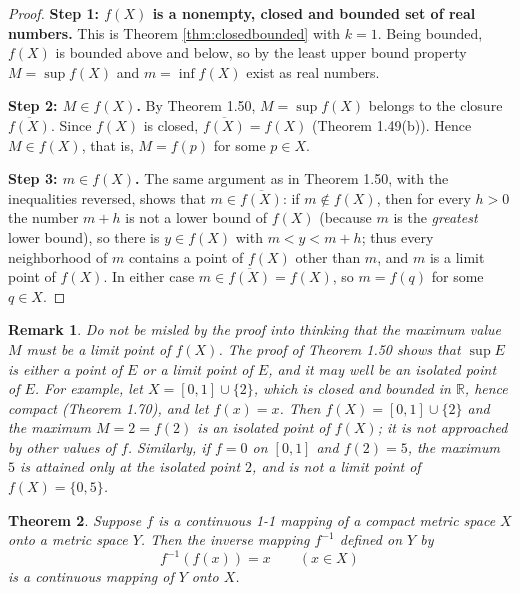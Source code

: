 \documentclass{article}
\theoremstyle{mythm}
\newtheorem{theorem}{Theorem}[section]
\newtheorem{remark}[theorem]{Remark}
\begin{document}
\begin{proof}
\textbf{Step 1: $f(X)$ is a nonempty, closed and bounded set of real numbers.} This is Theorem \ref{thm:closedbounded} with $k = 1$. Being bounded, $f(X)$ is bounded above and below, so by the least upper bound property $M = \sup f(X)$ and $m = \inf f(X)$ exist as real numbers.

\textbf{Step 2: $M \in f(X)$.} By Theorem 1.50, $M = \sup f(X)$ belongs to the closure $\overline{f(X)}$. Since $f(X)$ is closed, $\overline{f(X)} = f(X)$ (Theorem 1.49(b)). Hence $M \in f(X)$, that is, $M = f(p)$ for some $p \in X$.

\textbf{Step 3: $m \in f(X)$.} The same argument as in Theorem 1.50, with the inequalities reversed, shows that $m \in \overline{f(X)}$: if $m \notin f(X)$, then for every $h > 0$ the number $m + h$ is not a lower bound of $f(X)$ (because $m$ is the \textit{greatest} lower bound), so there is $y \in f(X)$ with $m < y < m + h$; thus every neighborhood of $m$ contains a point of $f(X)$ other than $m$, and $m$ is a limit point of $f(X)$. In either case $m \in \overline{f(X)} = f(X)$, so $m = f(q)$ for some $q \in X$.
\end{proof}

\begin{remark}\label{rem:supnotlimit}
Do not be misled by the proof into thinking that the maximum value $M$ must be a limit point of $f(X)$. The proof of Theorem 1.50 shows that $\sup E$ is \textit{either} a point of $E$ \textit{or} a limit point of $E$, and it may well be an isolated point of $E$. For example, let $X = [0,1] \cup \{2\}$, which is closed and bounded in $\mathbb{R}$, hence compact (Theorem 1.70), and let $f(x) = x$. Then $f(X) = [0,1] \cup \{2\}$ and the maximum $M = 2 = f(2)$ is an isolated point of $f(X)$; it is not approached by other values of $f$. Similarly, if $f = 0$ on $[0,1]$ and $f(2) = 5$, the maximum $5$ is attained only at the isolated point $2$, and is not a limit point of $f(X) = \{0, 5\}$.
\end{remark}

\begin{theorem}\label{thm:inverse}
Suppose $f$ is a continuous 1-1 mapping of a compact metric space $X$ onto a metric space $Y$. Then the inverse mapping $f^{-1}$ defined on $Y$ by
\[
f^{-1}(f(x)) = x \qquad (x \in X)
\]
is a continuous mapping of $Y$ onto $X$.
\end{theorem}
\end{document}

